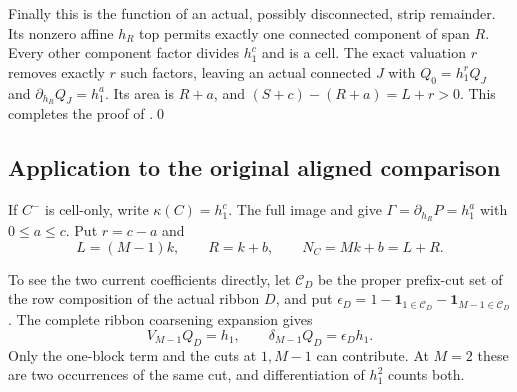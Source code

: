 \documentclass[11pt,a4paper]{amsart}
\numberwithin{equation}{section}
\theoremstyle{plain}
\theoremstyle{definition}
\newcommand{\one}{\mathbf1}
\begin{document}
Finally this is the function of an actual, possibly disconnected, strip
remainder.  Its nonzero affine \(h_R\) top permits exactly one connected
component of span \(R\).  Every other component factor divides \(h_1^c\) and
is a cell.  The exact valuation \(r\) removes exactly \(r\) such factors,
leaving an actual connected \(J\) with \(Q_0=h_1^rQ_J\) and
\(\partial_{h_R}Q_J=h_1^a\).  Its area is \(R+a\), and
\((S+c)-(R+a)=L+r>0\).  This completes the proof of
.\qed

\subsection{Application to the original aligned comparison}

If \(C^-\) is cell-only, write \(\kappa(C)=h_1^c\).  The full image and
 give \(\Gamma=\partial_{h_R}P=h_1^a\) with
\(0\le a\le c\).  Put \(r=c-a\) and
\[
 L=(M-1)k,\qquad R=k+b,\qquad N_C=Mk+b=L+R.
\]

To see the two current coefficients directly, let \(\mathcal C_D\) be
the proper prefix-cut set of the row composition of the actual ribbon
\(D\), and put
\(\epsilon_D=1-\one_{1\in\mathcal C_D}-\one_{M-1\in\mathcal C_D}\).
The complete ribbon coarsening expansion gives
\begin{equation}\label{eq:source-high-current}
 V_{M-1}Q_D=h_1,\qquad
 \delta_{M-1}Q_D=\epsilon_Dh_1.
\end{equation}
Only the one-block term and the cuts at \(1,M-1\) can contribute.
At \(M=2\) these are two occurrences of the same cut, and differentiation
of \(h_1^2\) counts both.
\end{document}
